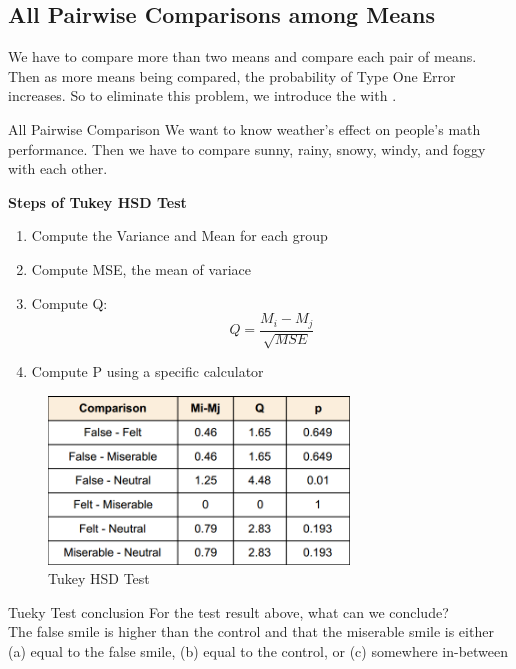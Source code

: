 \subsection{All Pairwise Comparisons among Means}
We have to compare more than two means and compare each pair of means. Then as more means being compared, the probability of Type One Error increases. So to eliminate this problem, we introduce the  with .
\begin{examplebox}{All Pairwise Comparison}
    We want to know weather's effect on people's math performance. Then we have to compare sunny, rainy, snowy, windy, and foggy with each other.
\end{examplebox}

\vbox{}
\textbf{Steps of Tukey HSD Test}
\begin{enumerate}
    \item Compute the Variance and Mean for each group
    \item Compute MSE, the mean of variace
    \item Compute Q: 
    \begin{equation}
        Q=\frac{M_i-M_j}{\sqrt{MSE}}
    \end{equation}
    \item Compute P using a specific calculator
\end{enumerate}

\begin{figure}[H]
        \centering
            \includegraphics[width=80mm]{Tukey.png}
            \caption{Tukey HSD Test}
            \label{Tukey HSD Test}
\end{figure}
\begin{examplebox}{Tueky Test conclusion}
    For the test result above, what can we conclude?
    \\The false smile is higher than the control
and that the miserable smile is either (a) equal to the false smile, (b) equal to the
control, or (c) somewhere in-between
\end{examplebox}
